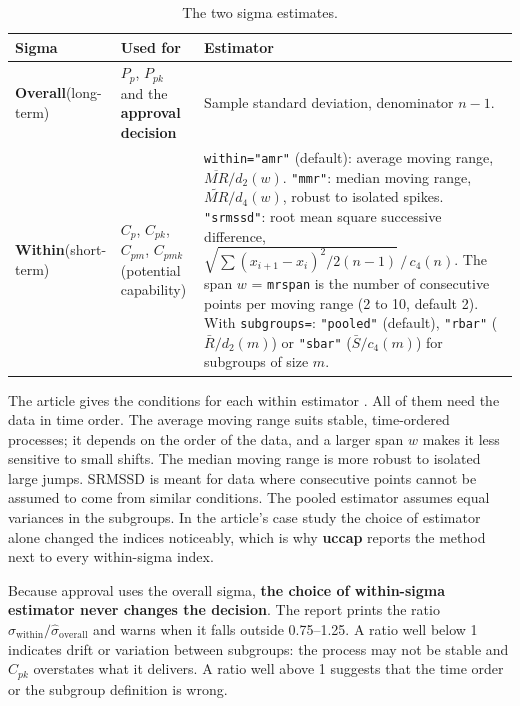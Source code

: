 \documentclass[a4paper,11pt,oneside,openany,parskip=half-,headings=standardclasses,toc=flat,numbers=noenddot]{scrbook}
\newcommand{\thead}[1]{{\sffamily\bfseries\footnotesize #1}}
\newcommand{\code}[1]{\texttt{\begingroup\def\_{\textunderscore\allowbreak}#1\endgroup}}
\newcommand{\pkg}{\textsf{\bfseries uccap}}
\begin{document}
\begin{table}[!htp]
\caption{The two sigma estimates.}\label{tab:sigma}
\small
\begin{tabularx}{\textwidth}{@{}P{23mm}P{30mm}L@{}}
\toprule
\thead{Sigma} & \thead{Used for} & \thead{Estimator}\\
\midrule
\textbf{Overall}\newline(long-term) & $P_p$, $P_{pk}$ and the \textbf{approval decision} & Sample standard deviation, denominator $n-1$.\\
\addlinespace
\textbf{Within}\newline(short-term) & $C_p$, $C_{pk}$, $C_{pm}$, $C_{pmk}$ (potential capability) &
\code{within="amr"} (default): average moving range, $\overline{MR}/d_2(w)$.\newline
\code{"mmr"}: median moving range, $\widetilde{MR}/d_4(w)$, robust to isolated spikes.\newline
\code{"srmssd"}: root mean square successive difference, $\sqrt{\sum (x_{i+1}-x_i)^2 / 2(n-1)}\,/\,c_4(n)$.\newline
The span $w$ = \code{mr\_span} is the number of consecutive points per moving range (2 to 10, default 2).\newline
With \code{subgroups=}: \code{"pooled"} (default), \code{"rbar"} ($\bar R/d_2(m)$) or \code{"sbar"} ($\bar S/c_4(m)$) for subgroups of size $m$.\\
\bottomrule
\end{tabularx}
\end{table}

The article gives the conditions for each within estimator \cite[Sec.~5.1]{jy-workflow}. All of them need the
data in time order. The average moving range suits stable, time-ordered processes; it depends on the order of the
data, and a larger span $w$ makes it less sensitive to small shifts. The median moving range is more robust to
isolated large jumps. SRMSSD is meant for data where consecutive points cannot be assumed to come from similar
conditions. The pooled estimator assumes equal variances in the subgroups. In the article's case study the choice
of estimator alone changed the indices noticeably, which is why \pkg{} reports the method next to every
within-sigma index.

Because approval uses the overall sigma, \textbf{the choice of within-sigma estimator never changes the
decision}. The report prints the ratio $\hat\sigma_{\text{within}}/\hat\sigma_{\text{overall}}$ and warns
when it falls outside 0.75--1.25. A ratio well below 1 indicates drift or variation between subgroups:
the process may not be stable and $C_{pk}$ overstates what it delivers. A ratio well above 1 suggests
that the time order or the subgroup definition is wrong.
\end{document}
